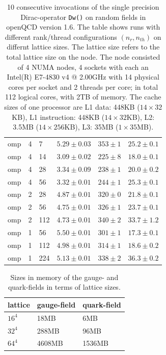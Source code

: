 \documentclass{article}
\theoremstyle{plain} %
\theoremstyle{convention} %
\theoremstyle{remark} %
\def\code#1{\texttt{#1}}
\numberwithin{equation}{section}
\begin{document}
\begin{table}
\begin{tabular}{ |p{1.5cm}||p{1cm}|p{1cm}|p{2cm}|p{2cm}|p{2cm}| }
        \hline
        omp & 4 & 7 & $5.29 \pm 0.03$ & $353 \pm 1$ & $25.2 \pm 0.1$ \\
        omp & 4 & 14 & $3.09 \pm 0.02$ & $225 \pm 8$ & $18.0 \pm 0.1$ \\
        omp & 4 & 28 & $3.34 \pm 0.09$ & $238 \pm 1$ & $20.0 \pm 0.2$ \\
        omp & 4 & 56 & $3.32 \pm 0.01$ & $244 \pm 1$ & $25.3 \pm 0.1$ \\
        \hline
        omp & 2 & 28 & $4.87 \pm 0.01$ & $320 \pm 0$ & $21.8 \pm 0.1$ \\
        omp & 2 & 56 & $4.75 \pm 0.01$ & $326 \pm 1$ & $23.7 \pm 0.1$ \\
        omp & 2 & 112 & $4.73 \pm 0.01$ & $340 \pm 2$ & $33.7 \pm 1.2$ \\
        \hline
        omp & 1 & 56 & $5.50 \pm 0.01$ & $301 \pm 1$ & $17.3 \pm 0.1$ \\
        omp & 1 & 112 & $4.98 \pm 0.01$ & $314 \pm 1$ & $18.6 \pm 0.2$ \\
        omp & 1 & 224 & $5.13 \pm 0.01$ & $338 \pm 2$ & $36.3 \pm 0.2$ \\
        \hline
    \end{tabular}
    \caption{\num{10} consecutive invocations of the single precision Dirac-operator \code{Dw()} on random fields in openQCD version 1.6. The table shows runs with different rank/thread configurations $(n_r, n_{th})$ on differnt lattice sizes. The lattice size refers to the total lattice size on the node. The node consisted of \num{4} NUMA nodes, \num{4} sockets with each an Intel(R) E7-4830 v4 @ 2.00GHz with \num{14} physical cores per socket and \num{2} threads per core; in total \num{112} logical cores, with 2TB of memory. The cache sizes of one processor are L1 data: 448KB ($14 \times 32$KB), L1 instruction: 448KB ($14 \times 32$KB), L2: 3.5MB ($14 \times 256$KB), L3: 35MB ($1 \times 35$MB).}
    \label{tab:dop_omp_intel}
\end{table}

\begin{table}
\centering
    \begin{tabular}{ |p{1cm}|p{2cm}|p{2cm}| }
        \hline
        lattice & gauge-field & quark-field \\
        \hline
        $16^4$ & 18MB & 6MB \\
        $32^4$ & 288MB & 96MB \\
        $64^4$ & 4608MB & 1536MB \\
        \hline
    \end{tabular}
    \caption{Sizes in memory of the gauge- and quark-fields in terms of lattice sizes.}
    \label{tab:lattice_sizes}
\end{table}
\end{document}
